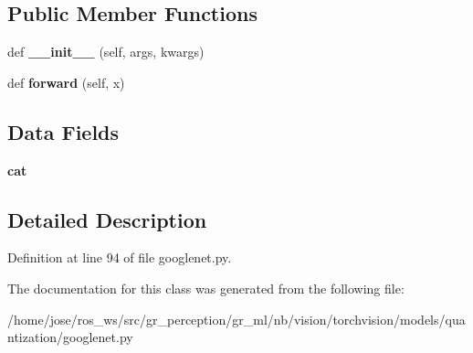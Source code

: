 \subsection*{Public Member Functions}
\begin{DoxyCompactItemize}
\item 
\mbox{\label{classtorchvision_1_1models_1_1quantization_1_1googlenet_1_1QuantizableInception_af949742cffa03b92a058a36a170e7c6b}} 
def {\bfseries \+\_\+\+\_\+init\+\_\+\+\_\+} (self, args, kwargs)
\item 
\mbox{\label{classtorchvision_1_1models_1_1quantization_1_1googlenet_1_1QuantizableInception_aa90131a9383ee755c7e61a4c6d7003d3}} 
def {\bfseries forward} (self, x)
\end{DoxyCompactItemize}
\subsection*{Data Fields}
\begin{DoxyCompactItemize}
\item 
\mbox{\label{classtorchvision_1_1models_1_1quantization_1_1googlenet_1_1QuantizableInception_a1842b258990665acb85adcfb9ecd8d76}} 
{\bfseries cat}
\end{DoxyCompactItemize}


\subsection{Detailed Description}


Definition at line 94 of file googlenet.\+py.



The documentation for this class was generated from the following file\+:\begin{DoxyCompactItemize}
\item 
/home/jose/ros\+\_\+ws/src/gr\+\_\+perception/gr\+\_\+ml/nb/vision/torchvision/models/quantization/googlenet.\+py\end{DoxyCompactItemize}
